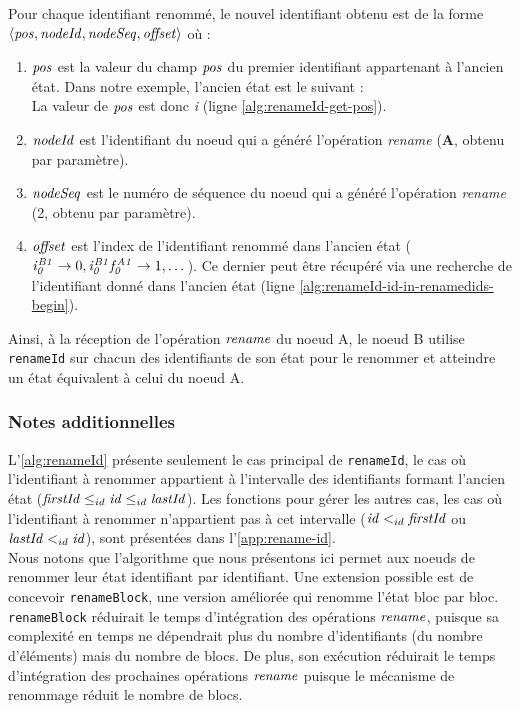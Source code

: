 Pour chaque identifiant renommé, le nouvel identifiant obtenu est de la forme $\langle \mathit{pos},\mathit{nodeId},\mathit{nodeSeq},\mathit{offset} \rangle$ où :
\begin{enumerate}
    \item $\mathit{pos}$ est la valeur du champ $\mathit{pos}$ du premier identifiant appartenant à l'ancien état.
        Dans notre exemple, l'ancien état est le suivant :
        \begin{equation*}
            [\betterid{i}{B1}{0},\betterid{i}{B1}{0}\betterid{f}{A1}{0},\betterid{i}{B1}{1},\betterid{i}{B1}{2}]
        \end{equation*}
        La valeur de $\mathit{pos}$ est donc \emph{i} (ligne \ref{alg:renameId-get-pos}).
    \item $\mathit{nodeId}$ est l'identifiant du noeud qui a généré l'opération \emph{rename} (\textbf{A}, obtenu par paramètre).
    \item $\mathit{nodeSeq}$ est le numéro de séquence du noeud qui a généré l'opération \emph{rename} (2, obtenu par paramètre).
    \item $\mathit{offset}$ est l'index de l'identifiant renommé dans l'ancien état ($\mathit{i}^{\mathit{B1}}_{\mathit{0}} \rightarrow 0,\mathit{i}^{\mathit{B1}}_{\mathit{0}}\mathit{f}^{\mathit{A1}}_{\mathit{0}} \rightarrow 1, \dots$).
    Ce dernier peut être récupéré via une recherche de l'identifiant donné dans l'ancien état (ligne \ref{alg:renameId-id-in-renamedids-begin}).
\end{enumerate}

Ainsi, à la réception de l'opération $\mathit{rename}$ du noeud A, le noeud B utilise \texttt{renameId} sur chacun des identifiants de son état pour le renommer et atteindre un état équivalent à celui du noeud A.\\

\subsubsection{Notes additionnelles}

L'\autoref{alg:renameId} présente seulement le cas principal de \texttt{renameId}, \ie le cas où l'identifiant à renommer appartient à l'intervalle des identifiants formant l'ancien état ($\mathit{firstId} \leq_{id} \mathit{id} \leq_{id} \mathit{lastId}$).
Les fonctions pour gérer les autres cas, \ie les cas où l'identifiant à renommer n'appartient pas à cet intervalle ($\mathit{id} <_{id} \mathit{firstId}$ ou $\mathit{lastId} <_{id} \mathit{id}$), sont présentées dans l'\autoref{app:rename-id}.\\

Nous notons que l'algorithme que nous présentons ici permet aux noeuds de renommer leur état identifiant par identifiant.
Une extension possible est de concevoir \texttt{renameBlock}, une version améliorée qui renomme l'état bloc par bloc.
\texttt{renameBlock} réduirait le temps d'intégration des opérations $\mathit{rename}$, puisque sa complexité en temps ne dépendrait plus du nombre d'identifiants (\ie du nombre d'éléments) mais du nombre de blocs.
De plus, son exécution réduirait le temps d'intégration des prochaines opérations $\mathit{rename}$ puisque le mécanisme de renommage réduit le nombre de blocs.
